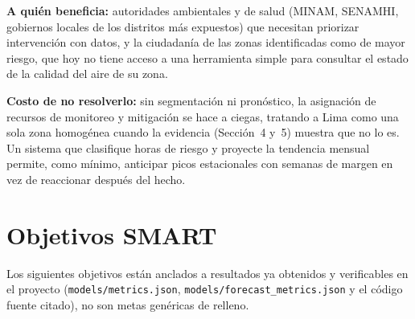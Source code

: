 \documentclass[11pt,a4paper]{article}
\begin{document}
\textbf{A quién beneficia:} autoridades ambientales y de salud (MINAM, SENAMHI, gobiernos
locales de los distritos más expuestos) que necesitan priorizar intervención con datos, y
la ciudadanía de las zonas identificadas como de mayor riesgo, que hoy no tiene acceso a
una herramienta simple para consultar el estado de la calidad del aire de su zona.

\textbf{Costo de no resolverlo:} sin segmentación ni pronóstico, la asignación de
recursos de monitoreo y mitigación se hace a ciegas, tratando a Lima como una sola zona
homogénea cuando la evidencia (Sección~4 y~5) muestra que no lo es. Un sistema que
clasifique horas de riesgo y proyecte la tendencia mensual permite, como mínimo,
anticipar picos estacionales con semanas de margen en vez de reaccionar después del
hecho.

\section{Objetivos SMART}

Los siguientes objetivos están anclados a resultados ya obtenidos y verificables en el
proyecto (\texttt{models/\allowbreak metrics.json}, \texttt{models/\allowbreak forecast\_metrics.json} y el
código fuente citado), no son metas genéricas de relleno.
\end{document}
